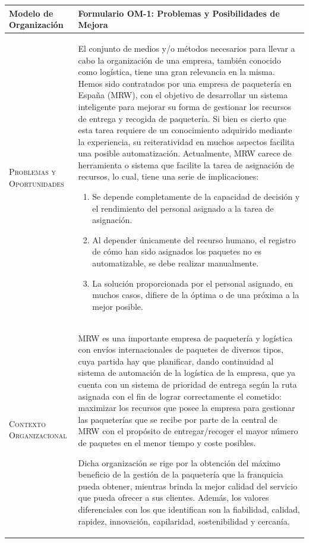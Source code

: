 \begin{table}[H]
  \scriptsize
  \begin{tabularx}{\textwidth}{|l|X|} 
    \hline
    \textbf{Modelo de Organización} & \textbf{Formulario OM-1: Problemas y Posibilidades de Mejora} \\ 
    \hline
    \hline
    \textsc{Problemas y Oportunidades} & El conjunto de medios y/o métodos necesarios para llevar a cabo la organización de una empresa, también conocido como logística, tiene una gran relevancia en la misma. Hemos sido contratados por una empresa de paquetería en España (MRW), con el objetivo de desarrollar un sistema inteligente para mejorar su forma de gestionar los recursos de entrega y recogida de paquetería. Si bien es cierto que esta tarea requiere de un conocimiento adquirido mediante la experiencia, su reiteratividad en muchos aspectos facilita una posible automatización. Actualmente, MRW carece de herramienta o sistema que facilite la tarea de asignación de recursos, lo cual, tiene una serie de implicaciones:
    \begin{enumerate}
      \item Se depende completamente de la capacidad de decisión y el rendimiento del personal asignado a la tarea de asignación.
      \item Al depender únicamente del recurso humano, el registro de cómo han sido asignados los paquetes no es automatizable, se debe realizar manualmente.
      \item La solución proporcionada por el personal asignado, en muchos casos, difiere de la óptima o de una próxima a la mejor posible.
    \end{enumerate}\\ 
    \hline
    \textsc{Contexto Organizacional} & 
    MRW es una importante empresa de paquetería y logística con envíos internacionales de paquetes de diversos tipos, cuya partida hay que planificar, dando continuidad al sistema de automación de la logística de la empresa, que ya cuenta con un sistema de prioridad de entrega según la ruta asignada con el fin de lograr correctamente el cometido: maximizar los recursos que posee la empresa para gestionar las paqueterías que se recibe por parte de la central de MRW con el propósito de entregar/recoger el mayor número de paquetes en el menor tiempo y coste posibles. 

    Dicha organización se rige por la obtención del máximo beneficio de la gestión de la paquetería que la franquicia pueda obtener, mientras brinda la mejor calidad del servicio que pueda ofrecer a sus clientes. Además, los valores diferenciales 
    con los que identifican son la fiabilidad, calidad, rapidez, innovación, capilaridad, sostenibilidad y cercanía.


\end{tabularx}
\end{table}
